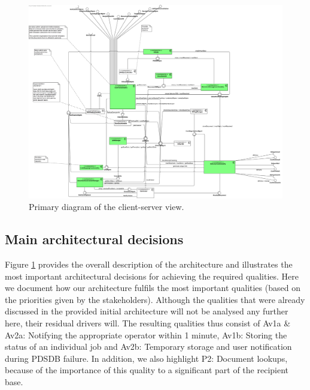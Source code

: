 \documentclass[a4paper,10pt]{article}
\begin{document}
\begin{figure}[!htp]
	\centering
	\includegraphics[height=0.9\textheight]{ClientServerView.png}
	\caption{Primary diagram of the client-server view.}
	\label{fig:cs-primary}
\end{figure}
\FloatBarrier

\subsection{Main architectural decisions}
Figure \ref{fig:cs-primary} provides the overall description of the architecture and illustrates the most important architectural decisions for achieving the required qualities. Here we document how our architecture fulfils the most important qualities (based on the priorities given by the stakeholders). Although the qualities that were already discussed in the provided initial architecture will not be analysed any further here, their residual drivers will. The resulting qualities thus consist of Av1a \& Av2a: Notifying the appropriate operator within 1 minute, Av1b: Storing the status of an individual job and Av2b: Temporary storage and user notification during PDSDB failure. In addition, we also highlight P2: Document lookups, because of the importance of this quality to a significant part of the recipient base.
\end{document}
